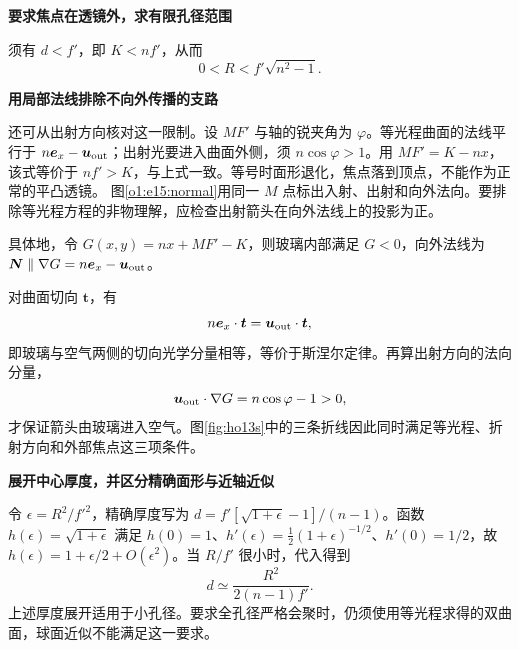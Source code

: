 \begin{solution}
\par\medskip{}\noindent\textbf{要求焦点在透镜外，求有限孔径范围}\par\nobreak
须有 $d<f'$，即 $K<nf'$，从而
\[
\boxed{0<R<f'\sqrt{n^2-1}.}
\]


\par\medskip{}\noindent\textbf{用局部法线排除不向外传播的支路}\par\nobreak
还可从出射方向核对这一限制。设 $MF'$ 与轴的锐夹角为 $\varphi$。等光程曲面的法线平行于 $n\bm e_x-\bm u_{\rm out}$；出射光要进入曲面外侧，须 $n\cos\varphi>1$。用 $MF'=K-nx$，该式等价于 $nf'>K$，与上式一致。等号时面形退化，焦点落到顶点，不能作为正常的平凸透镜。
图\ref{o1:e15:normal}用同一 $M$ 点标出入射、出射和向外法向。要排除等光程方程的非物理解，应检查出射箭头在向外法线上的投影为正。


具体地，令 $G(x,y)=nx+MF'-K$，则玻璃内部满足 $G<0$，向外法线为 $\bm N\parallel\nabla G=n\bm e_x-\bm u_{\rm out}$。

对曲面切向 $\bm t$，有
\[
n\bm e_x\cdot\bm t=\bm u_{\rm out}\cdot\bm t,
\]
即玻璃与空气两侧的切向光学分量相等，等价于斯涅尔定律。再算出射方向的法向分量，
\[
\bm u_{\rm out}\cdot\nabla G=n\cos\varphi-1>0,
\]
才保证箭头由玻璃进入空气。图\ref{fig:ho13s}中的三条折线因此同时满足等光程、折射方向和外部焦点这三项条件。



\par\medskip{}\noindent\textbf{展开中心厚度，并区分精确面形与近轴近似}\par\nobreak
令 $\epsilon=R^2/f'^2$，精确厚度写为 $d=f'[\sqrt{1+\epsilon}-1]/(n-1)$。函数 $h(\epsilon)=\sqrt{1+\epsilon}$ 满足 $h(0)=1$、$h'(\epsilon)=\tfrac12(1+\epsilon)^{-1/2}$、$h'(0)=1/2$，故 $h(\epsilon)=1+\epsilon/2+O(\epsilon^2)$。当 $R/f'$ 很小时，代入得到
\[
d\simeq\frac{R^2}{2(n-1)f'}.
\]
上述厚度展开适用于小孔径。要求全孔径严格会聚时，仍须使用等光程求得的双曲面，球面近似不能满足这一要求。
\end{solution}
